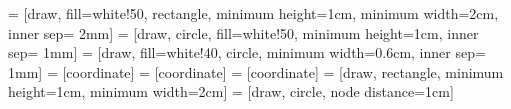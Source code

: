 \usepackage{%
  tikz,
  amssymb,
  graphicx,
  gensymb,
  mathrsfs,
  empheq,
  mathtools,
  amsthm,
  thmtools,
  verbatim,
  caption,
  sectsty,
  pgf,
  pgffor,
  ulem,
  amsmath,
  bm,
  times,
  pgfplots,
  3dplot
}


\usetikzlibrary{positioning}
\usetikzlibrary{decorations}
\usetikzlibrary{plotmarks}
\usetikzlibrary{decorations.markings}
\usetikzlibrary{decorations.pathmorphing}
\usetikzlibrary{matrix}
\usetikzlibrary{calc}
\usetikzlibrary{plotmarks}
\usetikzlibrary{shapes}
\usetikzlibrary{arrows.meta}

 = [draw, fill=white!50, rectangle, minimum height=1cm, minimum width=2cm, inner sep= 2mm]
 = [draw, circle, fill=white!50, minimum height=1cm, inner sep= 1mm]
 = [draw, fill=white!40, circle, minimum width=0.6cm, inner sep= 1mm]
 = [coordinate]
 = [coordinate]
 = [coordinate]
 = [draw, rectangle, minimum height=1cm, minimum width=2cm]
 = [draw, circle, node distance=1cm]
